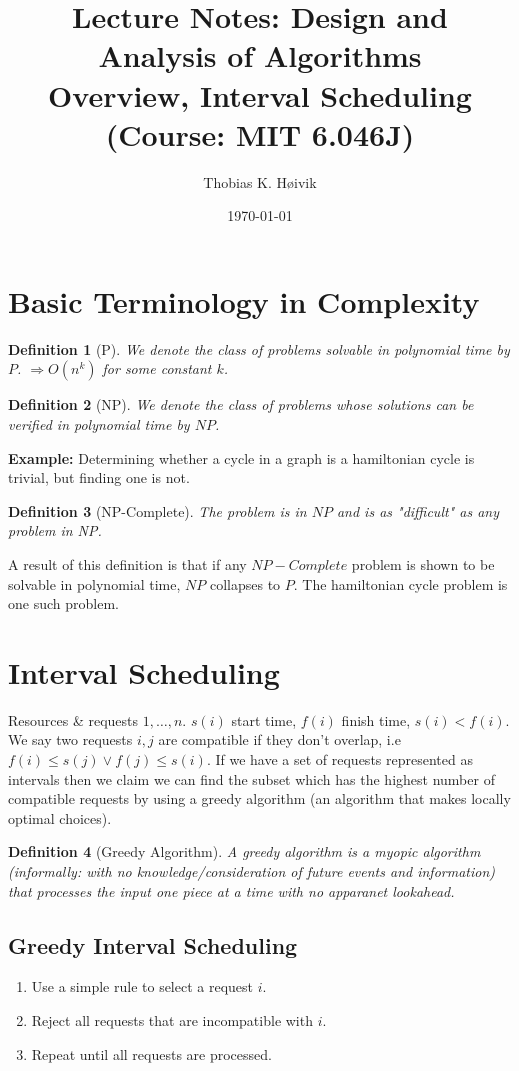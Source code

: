 \documentclass[12pt]{article}
\title{Lecture Notes: Design and Analysis of Algorithms \\ Overview, Interval Scheduling (Course: MIT 6.046J)}
\author{Thobias K. Høivik}
\date{\today}
\newtheorem{definition}{Definition}
\begin{document}
\maketitle
\section*{Basic Terminology in Complexity}
\begin{definition}[P]
    We denote the class of problems solvable in polynomial time by \(P\).
    \(\Rightarrow O(n^k)\) for some constant \(k\).
\end{definition}
\begin{definition}[NP]
    We denote the class of problems whose solutions can be verified in 
    polynomial time by \(NP\). 
\end{definition}

\noindent
\textbf{Example: }
Determining whether a cycle in a graph is a hamiltonian cycle is trivial, but finding 
one is not.

\begin{definition}[NP-Complete]
    The problem is in \(NP\) and is as "difficult" as any problem in NP.
\end{definition}
\noindent 
A result of this definition is that if any \(NP-Complete\) problem is shown to be solvable 
in polynomial time, \(NP\) collapses to \(P\). The hamiltonian cycle problem is one such 
problem.

\section*{Interval Scheduling}
Resources \& requests \(1,\dots,n\). \(s(i)\) start time, \(f(i)\) finish time, 
\(s(i) < f(i)\). 
We say two requests \(i,j\) are compatible if they don't overlap, 
i.e \(f(i) \leq s(j) \lor f(j) \leq s(i)\).
If we have a set of requests represented as intervals then we claim we can find 
the subset which has the highest number of compatible requests by using a greedy algorithm 
(an algorithm that makes locally optimal choices).
\begin{definition}[Greedy Algorithm]
    A greedy algorithm is a myopic algorithm (informally: with no knowledge/consideration 
    of future events and information) that processes the input one piece at a time 
    with no apparanet lookahead.
\end{definition}

\break
\subsection*{Greedy Interval Scheduling}
\begin{enumerate}
    \item Use a simple rule to select a request \(i\). 
    \item Reject all requests that are incompatible with \(i\). 
    \item Repeat until all requests are processed.
\end{enumerate}
\end{document}
